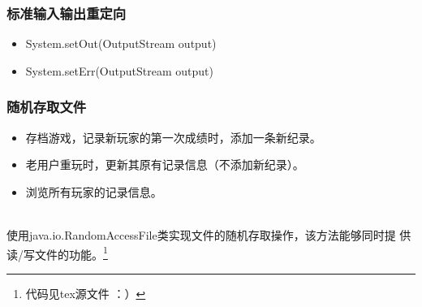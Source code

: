\begin{frame}[fragile] %
\frametitle{标准输入输出重定向}
\begin{itemize}
\item System.setOut(OutputStream output)
\item System.setErr(OutputStream output)
\end{itemize}
\end{frame}

\begin{frame}[fragile] %
\frametitle{随机存取文件}
\begin{itemize}
\item 存档游戏，记录新玩家的第一次成绩时，添加一条新纪录。
\item 老用户重玩时，更新其原有记录信息（不添加新纪录）。
\item 浏览所有玩家的记录信息。
\end{itemize}

 \\
使用java.io.RandomAccessFile类实现文件的随机存取操作，该方法能够同时提
供读/写文件的功能。\footnote{代码见tex源文件 ：）}

\end{frame}

